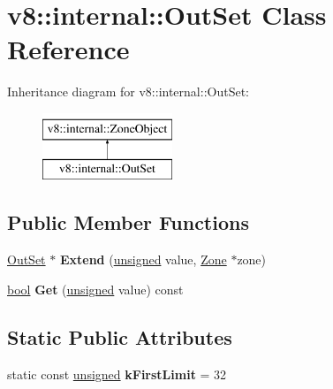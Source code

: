 \hypertarget{classv8_1_1internal_1_1OutSet}{}\section{v8\+:\+:internal\+:\+:Out\+Set Class Reference}
\label{classv8_1_1internal_1_1OutSet}
Inheritance diagram for v8\+:\+:internal\+:\+:Out\+Set\+:\begin{figure}[H]
\begin{center}
\leavevmode
\includegraphics[height=2.000000cm]{classv8_1_1internal_1_1OutSet}
\end{center}
\end{figure}
\subsection*{Public Member Functions}
\begin{DoxyCompactItemize}
\item 
\mbox{\label{classv8_1_1internal_1_1OutSet_aa6bc55c84c74372ed1fc4e05019d832f}} 
\mbox{\hyperlink{classv8_1_1internal_1_1OutSet}{Out\+Set}} $\ast$ {\bfseries Extend} (\mbox{\hyperlink{classunsigned}{unsigned}} value, \mbox{\hyperlink{classv8_1_1internal_1_1Zone}{Zone}} $\ast$zone)
\item 
\mbox{\label{classv8_1_1internal_1_1OutSet_abed483d08c026b7be8143c5af2304c28}} 
\mbox{\hyperlink{classbool}{bool}} {\bfseries Get} (\mbox{\hyperlink{classunsigned}{unsigned}} value) const
\end{DoxyCompactItemize}
\subsection*{Static Public Attributes}
\begin{DoxyCompactItemize}
\item 
\mbox{\label{classv8_1_1internal_1_1OutSet_ae14ea3db294239b6b919d9bb2b42f82c}} 
static const \mbox{\hyperlink{classunsigned}{unsigned}} {\bfseries k\+First\+Limit} = 32
\end{DoxyCompactItemize}
